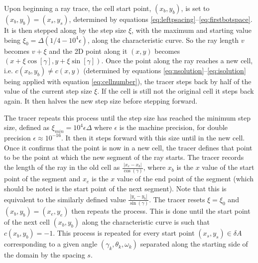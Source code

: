 \documentclass{article}
\begin{document}
Upon beginning a ray trace, the cell start point, $(x_b,y_b)$, is set to $(x_b,y_b)=(x_s,y_s)$, determined by equations \ref{eq:leftpsacing}--\ref{eq:firstbotspace}. 
It is then stepped along by the step size $\xi$, with the maximum and starting value being $\xi_0=\Delta(1/4-10^4\epsilon)$, along the characteristic curve.
So the ray length $v$ becomes $v+\xi$ and the 2D point along it $(x,y)$ becomes $(x+\xi \cos{\left[\gamma\right]},y+\xi \sin{\left[\gamma\right]})$. 
Once the point along the ray reaches a new cell, i.e. $c(x_b,y_b)\ne c(x,y)$ (determined by equations \ref{eq:nsolution}--\ref{eq:isolution} being applied with equation \ref{eq:cellnumber}), the tracer steps back by half of the value of the current step size $\xi$. 
If the cell is still not the original cell it steps back again. 
It then halves the new step size before stepping forward. 

The tracer repeats this process until the step size has reached the minimum step size, defined as $\xi_{min}=10^4 \epsilon \Delta$ where $\epsilon$ is the machine precision, for double precision $\epsilon\approx10^{-16}$. 
It then it steps forward with this size until in the new cell.
Once it confirms that the point is now in a new cell, the tracer defines that point to be the point at which the new segment of the ray starts.
The tracer records the length of the ray in the old cell as $\frac{|x_e-x_b|}{\cos{(\gamma)}}$, where $x_b$ is the $x$ value of the start point of the segment and $x_e$ is the $x$ value of the end point of the segment (which should be noted is the start point of the next segment). 
Note that this is equivalent to the similarly defined value $\frac{|y_e-y_b|}{\sin{(\gamma)}}$. 
The tracer resets $\xi=\xi_0$ and $(x_b,y_b)=(x_e,y_e)$ then repeats the process. 
This is done until the start point of the next cell $(x_b,y_b)$ along the characteristic curve is such that $c(x_b,y_b)=-1$.
This process is repeated for every start point $(x_s,y_s)\in \delta A$ corresponding to a given angle  $(\gamma_k,\theta_k,\omega_k)$ separated along the starting side of the domain by the spacing $s$. 
\end{document}
